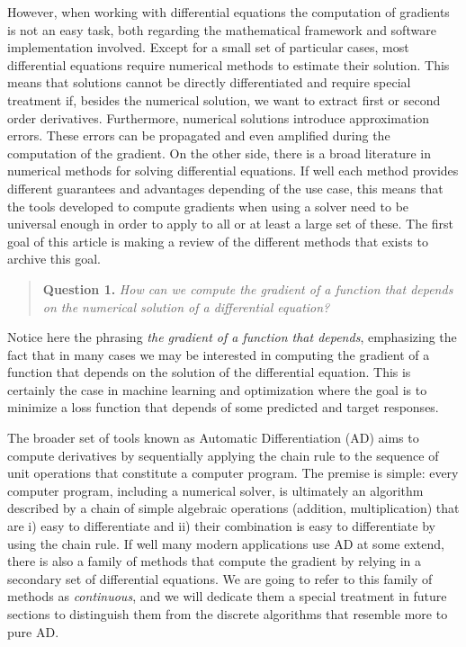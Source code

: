 However, when working with differential equations the computation of gradients is not an easy task, both regarding the mathematical framework and software implementation involved. 
Except for a small set of particular cases, most differential equations require numerical methods to estimate their solution. 
This means that solutions cannot be directly differentiated and require special treatment if, besides the numerical solution, we want to extract first or second order derivatives. 
Furthermore, numerical solutions introduce approximation errors. 
These errors can be propagated and even amplified during the computation of the gradient. 
On the other side, there is a broad literature in numerical methods for solving differential equations. 
If well each method provides different guarantees and advantages depending of the use case, this means that the tools developed to compute gradients when using a solver need to be universal enough in order to apply to all or at least a large set of these. 
The first goal of this article is making a review of the different methods that exists to archive this goal.
\begin{quote}
    \textbf{Question 1. }
    \textit{How can we compute the gradient of a function that depends on the numerical solution of a differential equation?}
\end{quote}
Notice here the phrasing \textit{the gradient of a function that depends}, emphasizing the fact that in many cases we may be interested in computing the gradient of a function that depends on the solution of the differential equation.
This is certainly the case in machine learning and optimization where the goal is to minimize a loss function that depends of some predicted and target responses. 

The broader set of tools known as Automatic Differentiation (AD) aims to compute derivatives by sequentially applying the chain rule to the sequence of unit operations that constitute a computer program. 
The premise is simple: every computer program, including a numerical solver, is ultimately an algorithm described by a chain of simple algebraic operations (addition, multiplication) that are i) easy to differentiate and ii) their combination is easy to differentiate by using the chain rule. 
If well many modern applications use AD at some extend, there is also a family of methods that compute the gradient by relying in a secondary set of differential equations. 
We are going to refer to this family of methods as \textit{continuous}, and we will dedicate them a special treatment in future sections to distinguish them from the discrete algorithms that resemble more to pure AD. 


